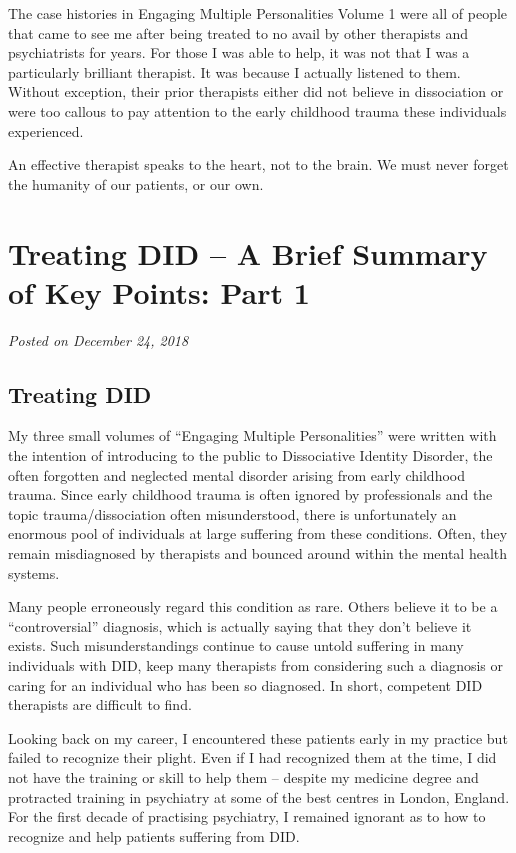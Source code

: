 \documentclass[]{book}
\begin{document}
The case histories in Engaging Multiple Personalities Volume 1 were all of people that came to see me after being treated to no avail by other therapists and psychiatrists for years. For those I was able to help, it was not that I was a particularly brilliant therapist. It was because I actually listened to them. Without exception, their prior therapists either did not believe in dissociation or were too callous to pay attention to the early childhood trauma these individuals experienced.

An effective therapist speaks to the heart, not to the brain. We must never forget the humanity of our patients, or our own.

\hypertarget{treating-did-a-brief-summary-of-key-points-part-1}{%
\section{Treating DID -- A Brief Summary of Key Points: Part 1}\label{treating-did-a-brief-summary-of-key-points-part-1}}

\emph{Posted on December 24, 2018}

\hypertarget{treating-did}{%
\subsection*{Treating DID}\label{treating-did}}

My three small volumes of ``Engaging Multiple Personalities'' were written with the intention of introducing to the public to Dissociative Identity Disorder, the often forgotten and neglected mental disorder arising from early childhood trauma. Since early childhood trauma is often ignored by professionals and the topic trauma/dissociation often misunderstood, there is unfortunately an enormous pool of individuals at large suffering from these conditions. Often, they remain misdiagnosed by therapists and bounced around within the mental health systems.

Many people erroneously regard this condition as rare. Others believe it to be a ``controversial'' diagnosis, which is actually saying that they don't believe it exists. Such misunderstandings continue to cause untold suffering in many individuals with DID, keep many therapists from considering such a diagnosis or caring for an individual who has been so diagnosed. In short, competent DID therapists are difficult to find.

Looking back on my career, I encountered these patients early in my practice but failed to recognize their plight. Even if I had recognized them at the time, I did not have the training or skill to help them -- despite my medicine degree and protracted training in psychiatry at some of the best centres in London, England. For the first decade of practising psychiatry, I remained ignorant as to how to recognize and help patients suffering from DID.
\end{document}
